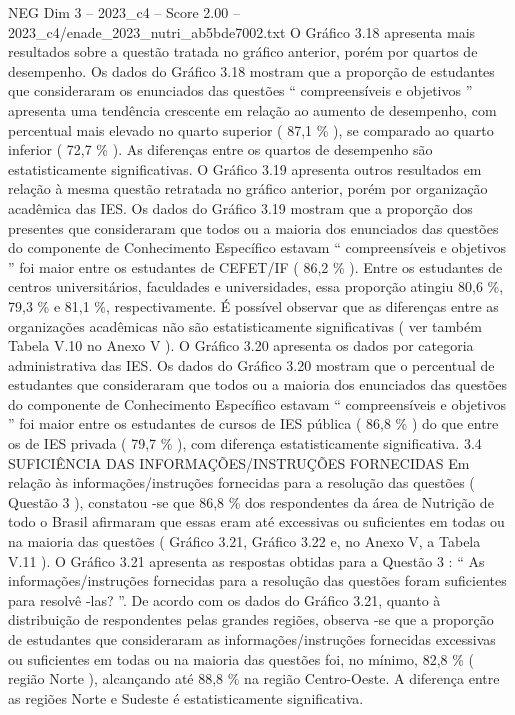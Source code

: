 \begin{textsample}{NEG Dim 3 – 2023\_c4 – Score 2.00 – 2023\_c4/enade\_2023\_nutri\_ab5bde7002.txt}
O Gráfico 3.18 apresenta mais resultados sobre a questão tratada no gráfico anterior, porém por quartos de desempenho.
Os dados do Gráfico 3.18 mostram que a proporção de estudantes que consideraram os enunciados das questões “ compreensíveis e objetivos ” apresenta uma tendência crescente em relação ao aumento de desempenho, com percentual mais elevado no quarto superior ( 87,1 \% ), se comparado ao quarto inferior ( 72,7 \% ).
As diferenças entre os quartos de desempenho são estatisticamente significativas.
O Gráfico 3.19 apresenta outros resultados em relação à mesma questão retratada no gráfico anterior, porém por organização acadêmica das IES.
Os dados do Gráfico 3.19 mostram que a proporção dos presentes que consideraram que todos ou a maioria dos enunciados das questões do componente de Conhecimento Específico estavam “ compreensíveis e objetivos ” foi maior entre os estudantes de CEFET/IF ( 86,2 \% ).
Entre os estudantes de centros universitários, faculdades e universidades, essa proporção atingiu 80,6 \%, 79,3 \% e 81,1 \%, respectivamente.
É possível observar que as diferenças entre as organizações acadêmicas não são estatisticamente significativas ( ver também Tabela V.10 no Anexo V ).
O Gráfico 3.20 apresenta os dados por categoria administrativa das IES.
Os dados do Gráfico 3.20 mostram que o percentual de estudantes que consideraram que todos ou a maioria dos enunciados das questões do componente de Conhecimento Específico estavam “ compreensíveis e objetivos ” foi maior entre os estudantes de cursos de IES pública ( 86,8 \% ) do que entre os de IES privada ( 79,7 \% ), com diferença estatisticamente significativa. 3.4 SUFICIÊNCIA DAS INFORMAÇÕES/INSTRUÇÕES FORNECIDAS Em relação às informações/instruções fornecidas para a resolução das questões ( Questão 3 ), constatou -se que 86,8 \% dos respondentes da área de Nutrição de todo o Brasil afirmaram que essas eram até excessivas ou suficientes em todas ou na maioria das questões ( Gráfico 3.21, Gráfico 3.22 e, no Anexo V, a Tabela V.11 ).
O Gráfico 3.21 apresenta as respostas obtidas para a Questão 3 : “ As informações/instruções fornecidas para a resolução das questões foram suficientes para resolvê -las? ”.
De acordo com os dados do Gráfico 3.21, quanto à distribuição de respondentes pelas grandes regiões, observa -se que a proporção de estudantes que consideraram as informações/instruções fornecidas excessivas ou suficientes em todas ou na maioria das questões foi, no mínimo, 82,8 \% ( região Norte ), alcançando até 88,8 \% na região Centro-Oeste.
A diferença entre as regiões Norte e Sudeste é estatisticamente significativa.

\end{textsample}
